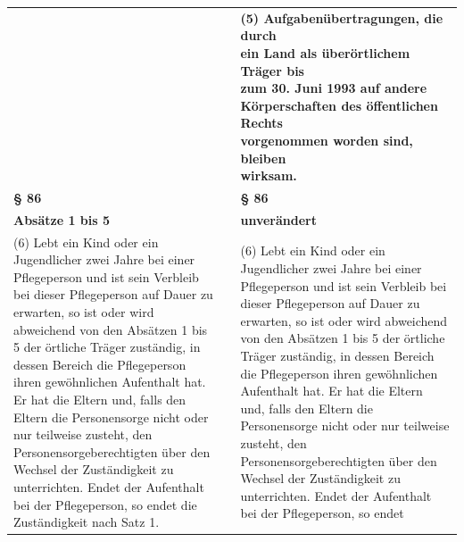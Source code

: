 \documentclass[10pt,a4paper,landscape]{article}
\begin{document}
\begin{longtable}{|L{8.2cm}|L{8.2cm}|L{8.2cm}|}
\hhline{|---|}
 &  & \textbf{\textcolor{diffgreen}{(5) Aufgabenübertragungen, die durch  \newline ein Land als überörtlichem Träger bis  \newline zum 30. Juni 1993 auf andere  \newline Körperschaften des öffentlichen Rechts  \newline vorgenommen worden sind, bleiben  \newline wirksam.}} \\
\hhline{|---|}
\textbf{\S{} 86} &  & \textbf{\S{} 86} \\
\hhline{|---|}
\textbf{Absätze 1 bis 5} &  & \textbf{unverändert} \\
\hhline{|---|}
(6) Lebt ein Kind oder ein Jugendlicher  \newline zwei Jahre bei einer Pflegeperson und ist  \newline sein Verbleib bei dieser Pflegeperson auf  \newline Dauer zu erwarten, so ist oder wird  \newline abweichend von den Absätzen 1 bis 5 der  \newline örtliche Träger zuständig, in dessen  \newline Bereich die Pflegeperson ihren  \newline gewöhnlichen Aufenthalt hat. Er hat die  \newline Eltern und, falls den Eltern die  \newline Personensorge nicht oder nur teilweise  \newline zusteht, den Personensorgeberechtigten  \newline über den Wechsel der Zuständigkeit zu  \newline unterrichten. Endet der Aufenthalt bei der  \newline Pflegeperson, so endet die Zuständigkeit  \newline nach Satz 1. &  & (6) Lebt ein Kind oder ein Jugendlicher  \newline zwei Jahre bei einer Pflegeperson und ist  \newline sein Verbleib bei dieser Pflegeperson auf  \newline Dauer zu erwarten, so ist oder wird  \newline abweichend von den Absätzen 1 bis 5 der  \newline örtliche Träger zuständig, in dessen  \newline Bereich die Pflegeperson ihren  \newline gewöhnlichen Aufenthalt hat. Er hat die  \newline Eltern und, falls den Eltern die  \newline Personensorge nicht oder nur teilweise  \newline zusteht, den Personensorgeberechtigten  \newline über den Wechsel der Zuständigkeit zu  \newline unterrichten. Endet der Aufenthalt bei der  \newline Pflegeperson, so endet 
\end{longtable}
\end{document}
